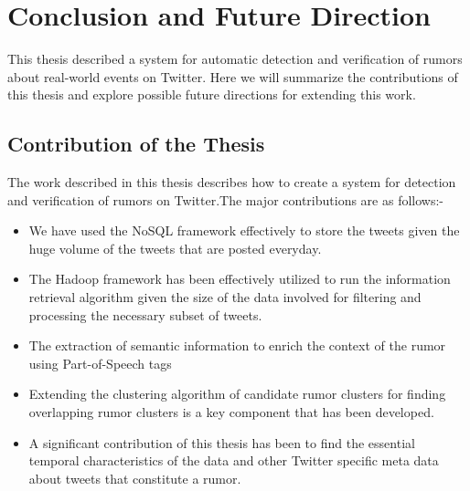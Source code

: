\chapter{Conclusion and Future Direction} 
This thesis described a system for automatic detection and verification of rumors about
real-world events on Twitter. Here we will summarize the contributions of this thesis and explore possible future directions for extending this work.
\section{Contribution of the Thesis}
The work described in this thesis describes how to create a system for detection and verification of rumors on Twitter.The major contributions are as follows:-
\begin{itemize}
\item We have used the NoSQL framework effectively to store the tweets given the huge volume of the tweets that are posted everyday.
\item The Hadoop framework has been effectively utilized to run the information retrieval algorithm given the size of the data involved for filtering and processing the necessary subset of tweets.
\item The extraction of semantic information to enrich the context of the rumor using Part-of-Speech tags
\item Extending the clustering algorithm of candidate rumor clusters for finding overlapping rumor clusters is a key component that has been developed.
\item A significant contribution of this thesis has been to find the essential temporal characteristics of the data and other Twitter specific meta data about tweets that constitute a rumor.
\end{itemize}
\clearpage

